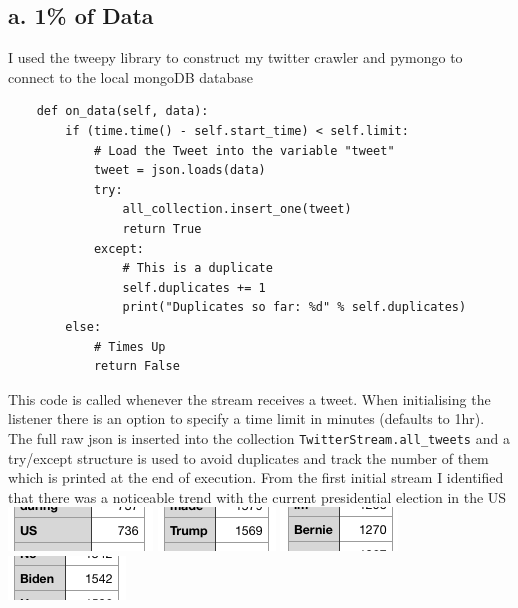 \documentclass[10pt,a4paper]{article}
\begin{document}
	\subsection*{a. 1\% of Data}
	I used the tweepy library to construct my twitter crawler and pymongo to connect to the local mongoDB database
	\begin{verbatim}
    def on_data(self, data):
        if (time.time() - self.start_time) < self.limit:
            # Load the Tweet into the variable "tweet"
            tweet = json.loads(data)
            try:
                all_collection.insert_one(tweet)
                return True
            except:
                # This is a duplicate
                self.duplicates += 1
                print("Duplicates so far: %d" % self.duplicates)
        else:
            # Times Up
            return False
	\end{verbatim}
	This code is called whenever the stream receives a tweet. When initialising the listener there is an option to specify a time limit in minutes (defaults to 1hr). The full raw json is inserted into the collection \verb|TwitterStream.all_tweets| and a try/except structure is used to avoid duplicates and track the number of them which is printed at the end of execution.
	From the first initial stream I identified that there was a noticeable trend with the current presidential election in the US \\
	\includegraphics[scale=1]{images/US.png}
	\includegraphics[scale=1]{images/trump.png} 
	\includegraphics[scale=1]{images/bernie.png}
	\includegraphics[scale=1]{images/biden.png} 
	
\end{document}
